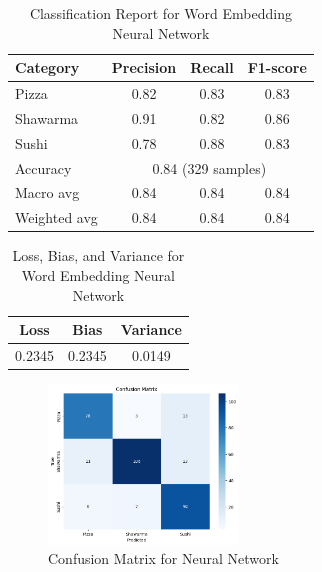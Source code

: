 \begin{table}[h]
    \centering
    \begin{tabular}{lccc}
        \hline
        Category     & Precision                              & Recall & F1-score \\
        \hline
        Pizza        & 0.82                                   & 0.83   & 0.83     \\
        Shawarma     & 0.91                                   & 0.82   & 0.86     \\
        Sushi        & 0.78                                   & 0.88   & 0.83     \\
        \hline
        Accuracy     & \multicolumn{3}{c}{0.84 (329 samples)}                     \\
        Macro avg    & 0.84                                   & 0.84   & 0.84     \\
        Weighted avg & 0.84                                   & 0.84   & 0.84     \\
        \hline
    \end{tabular}
    \caption{Classification Report for Word Embedding Neural Network}
\end{table}

\begin{table}[h]
    \centering
    \begin{tabular}{ccc}
        \hline
        Loss   & Bias   & Variance \\
        \hline
        0.2345 & 0.2345 & 0.0149   \\
        \hline
    \end{tabular}
    \caption{Loss, Bias, and Variance for Word Embedding Neural Network}
\end{table}

\begin{figure}[h]
    \centering
    \includegraphics[width=0.45\textwidth]{params/neuralnetwork_confusion.png}
    \caption{Confusion Matrix for Neural Network}
\end{figure}

